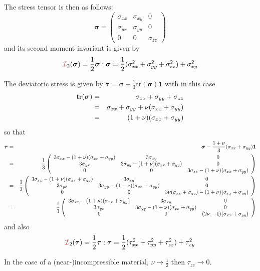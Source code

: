 The stress tensor is then as follows:
\[
{\bm \sigma}
=
\left(
\begin{array}{ccc}
\sigma_{xx}  & \sigma_{xy} & 0 \\
\sigma_{yx} & \sigma_{yy}  & 0 \\
0 & 0 & \sigma_{zz}
\end{array}
\right)
\]
and its second moment invariant is given by
\[
{\III}_2(\bm\sigma)
={\frac12 {\bm\sigma}:{\bm\sigma}}
={\frac12(\sigma_{xx}^2+\sigma_{yy}^2+\sigma_{zz}^2) +\sigma_{xy}^2
}
\]



The deviatoric stress is given by ${\bm \tau} 
= {\bm\sigma} -\frac13 \textrm{tr}(\bm\sigma){\bm 1}$ with
in this case
\begin{eqnarray}
\textrm{tr}(\bm\sigma) 
&=& \sigma_{xx}+\sigma_{yy}+\sigma_{zz} \nonumber\\
&=& \sigma_{xx}+\sigma_{yy}+\nu(\sigma_{xx}+\sigma_{yy})\nonumber\\
&=& (1+\nu) (\sigma_{xx}+\sigma_{yy})
\end{eqnarray}
so that
\begin{eqnarray}
{\bm \tau}
&=& {\bm\sigma} -\frac{1+\nu}{3} (\sigma_{xx}+\sigma_{yy})  {\bm 1} \nonumber\\
&=&
\frac13
\left(
\begin{array}{ccc}
3\sigma_{xx} - (1+\nu)(\sigma_{xx}+\sigma_{yy}) & 3\sigma_{xy} & 0 \\
3\sigma_{yx} & 3\sigma_{yy} - (1+\nu)(\sigma_{xx}+\sigma_{yy}) & 0 \\
0 & 0 & 3\sigma_{zz}- (1+\nu)(\sigma_{xx}+\sigma_{yy})
\end{array}
\right) \nonumber\\
&=&
\frac13
\left(
\begin{array}{ccc}
3\sigma_{xx} - (1+\nu)(\sigma_{xx}+\sigma_{yy}) & 3\sigma_{xy} & 0 \\
3\sigma_{yx} & 3\sigma_{yy} - (1+\nu)(\sigma_{xx}+\sigma_{yy}) & 0 \\
0 & 0 & 3\nu(\sigma_{xx}+\sigma_{yy})- (1+\nu)(\sigma_{xx}+\sigma_{yy})
\end{array}
\right) \nonumber\\
&=&
\frac13
\left(
\begin{array}{ccc}
3\sigma_{xx} - (1+\nu)(\sigma_{xx}+\sigma_{yy}) & 3\sigma_{xy} & 0 \\
3\sigma_{yx} & 3\sigma_{yy} - (1+\nu)(\sigma_{xx}+\sigma_{yy}) & 0 \\
0 & 0 & (2\nu-1)(\sigma_{xx}+\sigma_{yy})
\end{array}
\right) 
\end{eqnarray}
and also
\[
{\III}_2(\bm\tau)
={\frac12 {\bm\tau}:{\bm\tau}}
={\frac12(\tau_{xx}^2+\tau_{yy}^2+\tau_{zz}^2) +\tau_{xy}^2
}
\]
\begin{remark}
In the case of a (near-)incompressible material, $\nu\rightarrow \frac12$ then $\tau_{zz} \rightarrow 0$.
\end{remark}


